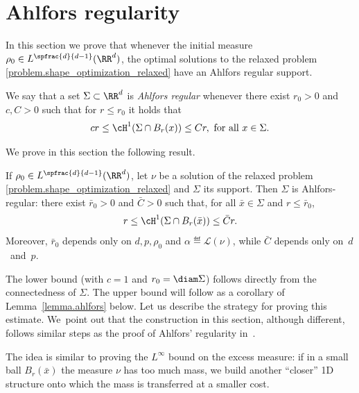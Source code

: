 \section{Ahlfors regularity}\label{section.ahlfors_regularity}
In this section we prove that whenever the initial measure $\rho_0 \in L^{\spfrac{d}{d-1}}(\RR^d)$, the optimal solutions to the relaxed problem \eqref{problem.shape_optimization_relaxed} have an Ahlfors regular support.

\begin{definition}\label{definition.alhfords_regularity}
We say that a set $\Sigma \subset \RR^d$ is \emph{Ahlfors regular} whenever there exist $r_0>0$ and $c,C>0$ such that for $r \le r_0$ it holds that
\[
cr \le \cH^1(\Sigma \cap B_r(x)) \le Cr, \text{ for all $x \in \Sigma$.}
\]
\end{definition}

We prove in this section the following result.
\begin{theorem}\label{th:ahlfors}
If $\rho_0\in L^{\spfrac{d}{d-1}}(\RR^d)$, let $\nu$ be a solution of the relaxed problem \eqref{problem.shape_optimization_relaxed} and $\Sigma$ its support. Then $\Sigma$ is Ahlfors-regular: there exist $\bar r_0>0$ and $\bar C>0$ such that, for all $\bar x \in \Sigma$ and $r \le \bar r_0$,
\[
r \le \cH^1(\Sigma \cap B_r(\bar x)) \le \bar C r.
\]
Moreover, $\bar r_0$ depends only on $d,p,\rho_0$ and $\alpha \eqdef \mathcal{L}(\nu)$, while $\bar C$ depends only on~$d$~and~$p$.
\end{theorem}
The lower bound (with $c=1$ and $r_0=\diam\Sigma$) follows directly from the connectedness of $\Sigma$. The upper bound will follow as a corollary of
Lemma~\ref{lemma.ahlfors} below. Let us describe the strategy for proving this estimate. We~point out that the construction in this section,
although different, follows similar steps as
the proof of Ahlfors' regularity in~\cite[Lem.\,6.1, Th.\,6.4]{paolini2004qualitative}.

The idea is similar to
proving the $L^\infty$ bound on the excess measure: if in a small ball
$B_r(\bar x)$ the measure $\nu$ has too much mass,
we build another ``closer'' 1D structure onto which the mass is transferred at a smaller cost.


